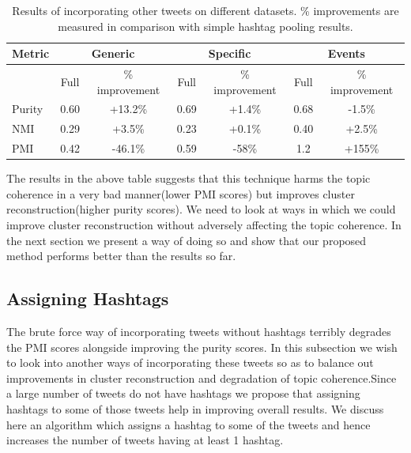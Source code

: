 \documentclass[10pt,a5paper,twoside]{article}
\begin{document}
\begin{table}[!h]
\centering
\resizebox{14cm}{!} 
{
	\begin{tabular}{|l|cc|cc|cc|}
	\hline
	Metric  & \multicolumn {2}{c}{Generic} & \multicolumn {2}{c}{Specific} & \multicolumn {2}{c|}{Events}\\
	\hline
	 & Full & \% improvement & Full & \% improvement & Full & \% improvement\\
	\hline
	Purity & 0.60 & +13.2\% & 0.69 & +1.4\% & 0.68 & -1.5\% \\
	\hline
	NMI & 0.29 & +3.5\% & 0.23 & +0.1\% & 0.40 & +2.5\% \\
	\hline
	PMI & 0.42 & -46.1\% & 0.59 & -58\% & 1.2 & +155\% \\
	\hline
	\end{tabular}
}
\caption{Results of incorporating other tweets on different datasets. \% improvements are measured in comparison with simple hashtag pooling results.}\label{tbl-8}
\end{table}

The results in the above table suggests that this technique harms the topic coherence in a very bad manner(lower PMI scores) but improves cluster reconstruction(higher purity scores). We need to look at ways in which we could improve cluster reconstruction without adversely affecting the topic coherence. In the next section we present a way of doing so and show that our proposed method performs better than the results so far.

\subsection{Assigning Hashtags}
The brute force way of incorporating tweets without hashtags terribly degrades the PMI scores alongside improving the purity scores. In this subsection we wish to look into another ways of incorporating these tweets so as to balance out improvements in cluster reconstruction and degradation of topic coherence.Since a large number of tweets do not have hashtags we propose that assigning hashtags to some of those tweets help in improving overall results. We discuss here an algorithm which assigns a hashtag to some of the tweets and hence increases the number of tweets having at least 1 hashtag.
\end{document}
